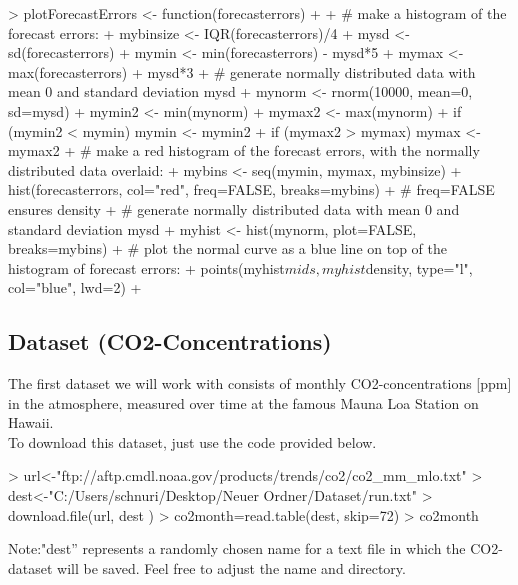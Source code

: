 \documentclass[11pt, a4paper]{article} %
\begin{document}
\begin{Schunk}
\begin{Sinput}
> plotForecastErrors <- function(forecasterrors)
+ {
+   # make a histogram of the forecast errors:
+   mybinsize <- IQR(forecasterrors)/4
+   mysd   <- sd(forecasterrors)
+   mymin  <- min(forecasterrors) - mysd*5
+   mymax  <- max(forecasterrors) + mysd*3
+   # generate normally distributed data with mean 0 and standard deviation mysd
+   mynorm <- rnorm(10000, mean=0, sd=mysd)
+   mymin2 <- min(mynorm)
+   mymax2 <- max(mynorm)
+   if (mymin2 < mymin) { mymin <- mymin2 }
+   if (mymax2 > mymax) { mymax <- mymax2 }
+   # make a red histogram of the forecast errors, with the normally distributed data overlaid:
+   mybins <- seq(mymin, mymax, mybinsize)
+   hist(forecasterrors, col="red", freq=FALSE, breaks=mybins)
+   # freq=FALSE ensures density
+   # generate normally distributed data with mean 0 and standard deviation mysd
+   myhist <- hist(mynorm, plot=FALSE, breaks=mybins)
+   # plot the normal curve as a blue line on top of the histogram of forecast errors:
+   points(myhist$mids, myhist$density, type="l", col="blue", lwd=2)
+ }
\end{Sinput}
\end{Schunk}



\subsection{Dataset (CO2-Concentrations)}%
The first dataset we will work with consists of monthly CO2-concentrations [ppm] in the atmosphere, measured over time at the famous Mauna Loa Station on Hawaii.\\
To download this dataset, just use the code provided below.

\begin{Schunk}
\begin{Sinput}
> url<-"ftp://aftp.cmdl.noaa.gov/products/trends/co2/co2_mm_mlo.txt"
> dest<-"C:/Users/schnuri/Desktop/Neuer Ordner/Dataset/run.txt"
> download.file(url, dest ) 
> co2month=read.table(dest, skip=72)
> co2month
\end{Sinput}
\end{Schunk}

\noindent Note:"dest'' represents a randomly chosen  name for a text file in which the CO2-dataset will be saved. Feel free to adjust the name and directory.
\end{document}
